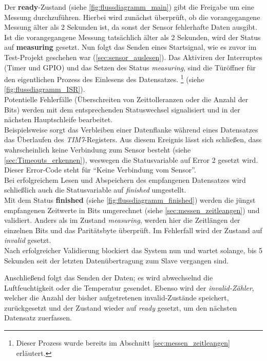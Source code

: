 \documentclass[11pt,a4paper,titlepage]{article}
\begin{document}
Der \textbf{ready}-Zustand (siehe \cref{fig:flussdiagramm_main}) gibt die Freigabe um eine Messung durchzuführen.
Hierbei wird zunächst überprüft, ob die vorangegangene Messung älter als 2 Sekunden ist, da sonst der Sensor fehlerhafte Daten ausgibt.\\
Ist die vorangegangene Messung tatsächlich älter als 2 Sekunden, wird der Status auf \textbf{measuring} gesetzt.
Nun folgt das Senden eines Startsignal, wie es zuvor im Test-Projekt geschehen war (\cref{sec:sensor_auslesen}).
Das Aktiviren der Interruptes (Timer und GPIO) und das Setzen des Status \textit{measuring},
sind die Türöffner für den eigentlichen Prozess des Einlesens des Datensatzes.
\footnote{Dieser Prozess wurde bereits im Abschnitt \cref{sec:messen_zeitleangen} erläutert.}
(siehe \cref{fig:flussdiagramm_ISR}).\\
Potentielle Fehlerfälle (Überschreiten von Zeittolleranzen oder die Anzahl der Bits)
werden mit dem entsprechenden Statuswechsel signalisiert und in der nächsten Hauptschleife bearbeitet.\\
Beispielsweise sorgt das Verbleiben einer Datenflanke während eines Datensatzes das Überlaufen des \textit{TIM7}-Registers.
Aus diesem Ereignis lässt sich schließen, dass wahrscheinlich keine Verbindung zum Sensor besteht (siehe \cref{sec:Timeouts_erkennen}),
weswegen die Statusvariable auf Error 2 gesetzt wird.
Dieser Error-Code steht für ``Keine Verbindung vom Sensor''.\\

Bei erfolgreichem Lesen und Abspeichern des empfangenen Datensatzes wird schließlich auch die Statusvariable auf \textit{finished} umgestellt.\\

Mit dem Status \textbf{finished} (siehe \cref{fig:flussdiagramm_finished}) werden die jüngst empfangenen Zeitwerte
in Bits umgerechnet (siehe \cref{sec:messen_zeitleangen}) und validiert.
Anders als im Zustand \textit{measuring}, werden hier die Zeitlängen der einzelnen Bits und das Paritätsbyte überprüft.
Im Fehlerfall wird der Zustand auf \textit{invalid} gesetzt.\\

Nach erfolgreicher Validierung blockiert das System nun und wartet solange, 
bis 5 Sekunden seit der letzten Datenübertragung zum Slave vergangen sind.

Anschließend folgt das Senden der Daten; es wird abwechselnd die Luftfeuchtigkeit oder die Temperatur gesendet.
Ebenso wird der \textit{invalid-Zähler}, welcher die Anzahl der bisher aufgetretenen invalid-Zustände speichert, zurückgesetzt
und der Zustand wieder auf \textit{ready} gesetzt, um den nächsten Datensatz zuerfassen.\\
\end{document}
